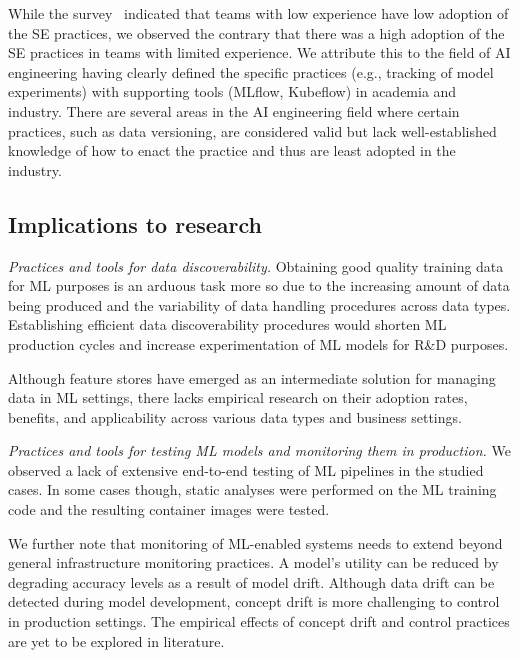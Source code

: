 \documentclass{IEEEcsmag}
\begin{document}
While the survey~\cite{Serban2020Practices} indicated that teams with low experience have low adoption of the SE practices, we observed the contrary that there was a high adoption of the SE practices in teams with limited experience. We attribute this to the field of AI engineering having clearly defined the specific practices (e.g., tracking of model experiments) with supporting tools (MLflow, Kubeflow) in academia and industry. There are several areas in the AI engineering field where certain practices, such as data versioning, are considered valid but lack well-established knowledge of how to enact the practice and thus are least adopted in the industry.


\subsection{Implications to research}
\textit{Practices and tools for data discoverability.} Obtaining good quality training data for ML purposes is an arduous task more so due to the increasing amount of data being produced and the variability of data handling procedures across data types. Establishing efficient data discoverability procedures would shorten ML production cycles and increase experimentation of ML models for R\&D purposes.

Although feature stores have emerged as an intermediate solution for managing data in ML settings, there lacks empirical research on their adoption rates, benefits, and applicability across various data types and business settings.

\textit{Practices and tools for testing ML models and monitoring them in production.} We observed a lack of extensive end-to-end testing of ML pipelines in the studied cases. In some cases though, static analyses were performed on the ML training code and the resulting container images were tested. 

We further note that monitoring of ML-enabled systems needs to extend beyond general infrastructure monitoring practices. A model's utility can be reduced by degrading accuracy levels as a result of model drift. Although data drift can be detected during model development, concept drift is more challenging to control in production settings. The empirical effects of concept drift and control practices are yet to be explored in literature.
\end{document}
